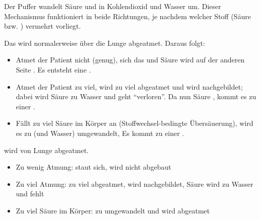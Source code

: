 {%
\label{topic:bikarbonatpuffer}
Der  Puffer wandelt Säure  und
 in Kohlendioxid  und
Wasser  um. Dieser Mechanismus funktioniert in
beide Richtungen, je nachdem welcher Stoff (Säure bzw.
) vermehrt vorliegt.

\bigskip
{}

Das  wird normalerweise über die Lunge abgeatmet. Daraus folgt:
\begin{itemize}
  \item Atmet der Patient nicht (genug), 
  sich das  und Säure wird auf der anderen Seite . Es entsteht eine .
  \item Atmet der Patient zu viel, wird zu viel
   abgeatmet und wird nachgebildet; dabei wird Säure
  zu Wasser und geht \enquote{verloren}. Da nun Säure
  , kommt es zu einer .
  \item Fällt zu viel Säure im
  Körper an (Stoffwechsel-bedingte Übersäuerung), wird
  es zu   (und Wasser) umgewandelt,  Es kommt zu einer .
\end{itemize}
}{%

 wird von Lunge abgeatmet.
\begin{itemize}
  \item Zu wenig Atmung:  staut
  sich,  wird nicht abgebaut

  \item Zu viel Atmung:  zu viel  abgeatmet,  wird
  nachgebildet, Säure wird zu Wasser und fehlt

  \item Zu viel Säure  im
  Körper: zu  umgewandelt und wird abgeatmet
\end{itemize}
}{}{}{}









